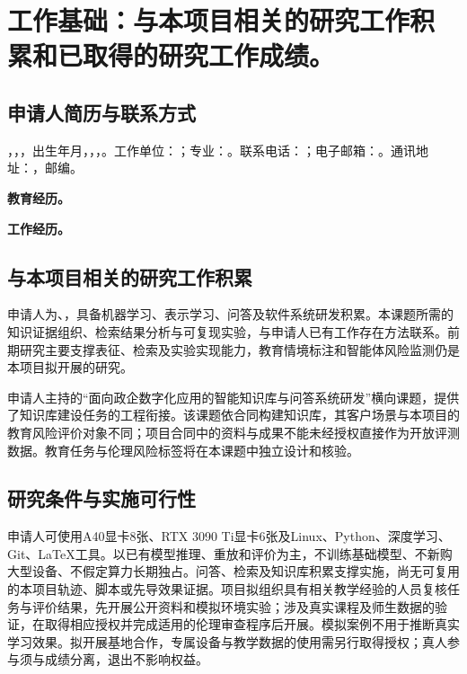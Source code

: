 
\section{\textbf{工作基础}：与本项目相关的研究工作积累和已取得的研究工作成绩。}

\subsection{申请人简历与联系方式}
，，，出生年月，，，。工作单位：；专业：。联系电话：；电子邮箱：。通讯地址：，邮编。

\textbf{教育经历。}

\textbf{工作经历。}

\subsection{与本项目相关的研究工作积累}

申请人为、，具备机器学习、表示学习、问答及软件系统研发积累。本课题所需的知识证据组织、检索结果分析与可复现实验，与申请人已有工作存在方法联系。前期研究主要支撑表征、检索及实验实现能力，教育情境标注和智能体风险监测仍是本项目拟开展的研究。

申请人主持的“面向政企数字化应用的智能知识库与问答系统研发”横向课题，提供了知识库建设任务的工程衔接。该课题依合同构建知识库，其客户场景与本项目的教育风险评价对象不同；项目合同中的资料与成果不能未经授权直接作为开放评测数据。教育任务与伦理风险标签将在本课题中独立设计和核验。

\subsection{研究条件与实施可行性}\label{subsec:conditions}
申请人可使用A40显卡8张、RTX 3090 Ti显卡6张及Linux、Python、深度学习、Git、LaTeX工具。以已有模型推理、重放和评价为主，不训练基础模型、不新购大型设备、不假定算力长期独占。问答、检索及知识库积累支撑实施，尚无可复用的本项目轨迹、脚本或先导效果证据。项目拟组织具有相关教学经验的人员复核任务与评价结果，先开展公开资料和模拟环境实验；涉及真实课程及师生数据的验证，在取得相应授权并完成适用的伦理审查程序后开展。模拟案例不用于推断真实学习效果。拟开展基地合作，专属设备与教学数据的使用需另行取得授权；真人参与须与成绩分离，退出不影响权益。

